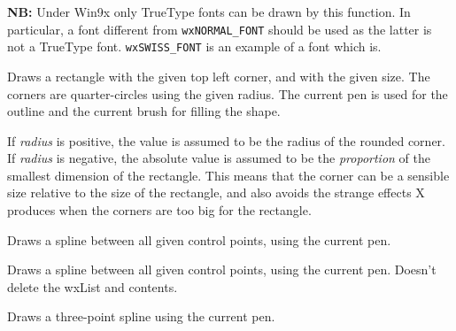 {\bf NB:} Under Win9x only TrueType fonts can be drawn by this function. In
particular, a font different from {\tt wxNORMAL\_FONT} should be used as the
latter is not a TrueType font. {\tt wxSWISS\_FONT} is an example of a font
which is.




\label{wxdcdrawroundedrectangle}


Draws a rectangle with the given top left corner, and with the given
size.  The corners are quarter-circles using the given radius. The
current pen is used for the outline and the current brush for filling
the shape.

If {\it radius} is positive, the value is assumed to be the
radius of the rounded corner. If {\it radius} is negative,
the absolute value is assumed to be the {\it proportion} of the smallest
dimension of the rectangle. This means that the corner can be
a sensible size relative to the size of the rectangle, and also avoids
the strange effects X produces when the corners are too big for
the rectangle.


\label{wxdcdrawspline}


Draws a spline between all given control points, using the current
pen.


Draws a spline between all given control points, using the current
pen.  Doesn't delete the wxList and contents.


Draws a three-point spline using the current pen.




\label{wxdcdrawtext}

